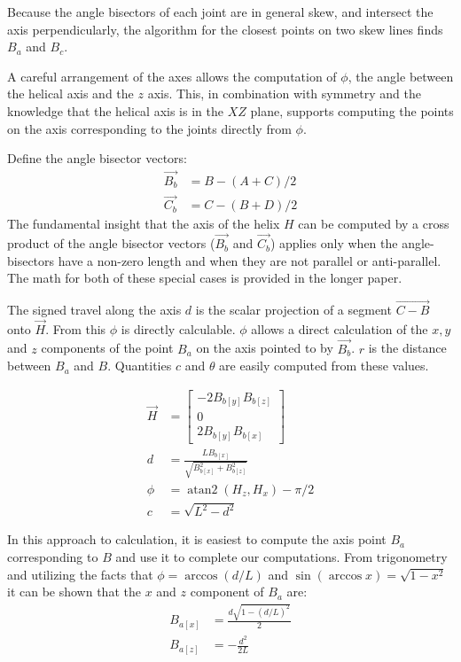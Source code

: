 \documentclass{svproc}
\DeclareMathOperator{\atantwo}{atan2}
\begin{document}
Because the angle bisectors of each joint are in general skew, and intersect the
axis perpendicularly, the algorithm
for the closest points on two skew lines finds $B_a$ and $B_c$.

A careful arrangement of the axes
allows the computation of $\phi$, the angle between the helical axis
and the $z$ axis. This, in combination with symmetry and the knowledge
that the helical axis is in the $XZ$ plane, supports computing the
points on the axis corresponding to the joints directly from $\phi$.

Define the angle bisector vectors:
\begin{align}
  \overrightarrow{B_b} &= B - (A + C)/2 \\
  \overrightarrow{C_b} &= C - (B + D)/2
  \end{align}
The fundamental insight that the axis of the helix $H$ can be
computed by a cross product of the angle bisector
vectors ($\overrightarrow{B_b}$ and $\overrightarrow{C_b}$) applies only
when the angle-bisectors have a non-zero length and when
they are not parallel or anti-parallel.
The math for both of these special cases is provided in the longer paper\cite{readfullsegmentedhelix}.

The signed travel along the axis $d$ is
the scalar projection of a segment $\overrightarrow{C - B}$ onto $\overrightarrow{H}$.
From this $\phi$ is directly calculable. $\phi$ allows
a direct calculation of the $x,y$ and $z$ components of the
point $B_a$ on the axis pointed to by $\overrightarrow{B_b}$.
$r$ is the distance between $B_a$ and $B$. Quantities $c$ and $\theta$
are easily computed from these values.

\begin{align}
  \overrightarrow{H} &=  \begin{bmatrix} -2 B_{b[y]} B_{b[z]} \\ 0 \\ 2 B_{b[y]} B_{b[x]}  \end{bmatrix} \\
  d &= \frac{L B_{b[x]}}{\sqrt{B_{b[x]}^2 + B_{b[z]}^2}}  \\
  \phi &= \atantwo{(H_z,H_x)} - \pi/2  \\
  c &= \sqrt{L^2 - d^2}
\end{align}

In this approach to calculation, it is easiest
to compute the axis point $B_a$ corresponding to $B$ and
use it to complete our computations.
From trigonometry and utilizing the facts that $\phi = \arccos{(d/L)}$  and $\sin{(\arccos{x})} = \sqrt{1 - x^2}$ it
can be shown that
the $x$ and $z$ component of $B_a$ are:
\begin{align}
  B_{a[x]} &= \frac{d\sqrt{1 - (d/L)^2}}{2} \\
  B_{a[z]} &= -\frac{d^2}{2L}
\end{align}
\end{document}
